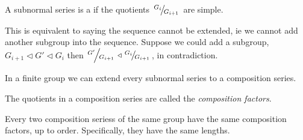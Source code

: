 \documentclass[10pt]{article}
\def\slfrac#1#2{\left.{}^{#1}\mkern-4mu\middle/\mkern-3mu{}_{#2}\right.}
\begin{document}
\begin{defn*}

    A subnormal series is a  if the quotients $\slfrac{G_i}{G_{i+1}}$ are simple.

\end{defn*}

This is equivalent to saying the sequence cannot be extended, ie we cannot add another subgroup into the sequence.
Suppose we could add a subgroup, $G_{i+1}\triangleleft G'\triangleleft G_i$ then $\slfrac{G'}{G_{i+1}}\triangleleft\slfrac{G_i}{G_{i+1}}$, in contradiction.

In a finite group we can extend every subnormal series to a composition series.

The quotients in a composition series are called the \emph{composition factors}.

\begin{thrm*}

    Every two composition seriess of the same group have the same composition factors, up to order.
    Specifically, they have the same lengths.

\end{thrm*}
\end{document}
